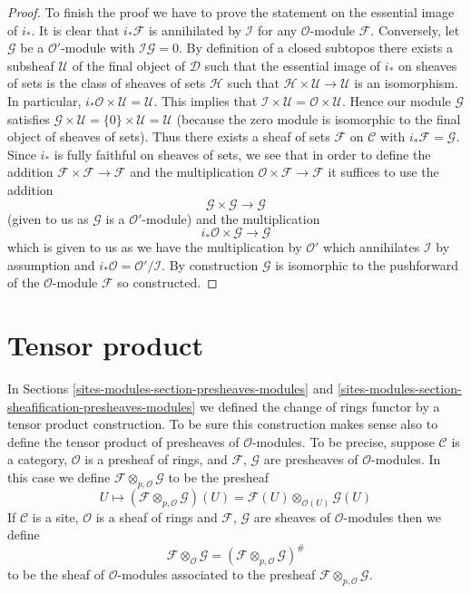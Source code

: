 \begin{proof}
\medskip\noindent
To finish the proof we have to prove the statement on the essential
image of $i_*$. It is clear that $i_*\mathcal{F}$ is annihilated by
$\mathcal{I}$ for any $\mathcal{O}$-module $\mathcal{F}$. Conversely,
let $\mathcal{G}$ be a $\mathcal{O}'$-module with
$\mathcal{I}\mathcal{G} = 0$. By definition of a closed subtopos
there exists a subsheaf $\mathcal{U}$ of the final object of
$\mathcal{D}$ such that the essential image of $i_*$ on sheaves of sets
is the class of sheaves of sets $\mathcal{H}$ such that
$\mathcal{H} \times \mathcal{U} \to \mathcal{U}$ is an isomorphism.
In particular, $i_*\mathcal{O} \times \mathcal{U} = \mathcal{U}$.
This implies that
$\mathcal{I} \times \mathcal{U} = \mathcal{O} \times \mathcal{U}$.
Hence our module $\mathcal{G}$ satisfies
$\mathcal{G} \times \mathcal{U} = \{0\} \times \mathcal{U} = \mathcal{U}$
(because the zero module is isomorphic to the final object of sheaves
of sets). Thus there exists a sheaf of sets $\mathcal{F}$ on $\mathcal{C}$
with $i_*\mathcal{F} = \mathcal{G}$. Since $i_*$ is fully faithful on sheaves
of sets, we see that in order to define the
addition $\mathcal{F} \times \mathcal{F} \to \mathcal{F}$ and the
multiplication $\mathcal{O} \times \mathcal{F} \to \mathcal{F}$
it suffices to use the addition
$$
\mathcal{G} \times \mathcal{G} \longrightarrow \mathcal{G}
$$
(given to us as $\mathcal{G}$ is a $\mathcal{O}'$-module)
and the multiplication
$$
i_*\mathcal{O} \times \mathcal{G} \to \mathcal{G}
$$
which is given to us as we have the multiplication by
$\mathcal{O}'$ which annihilates $\mathcal{I}$ by assumption
and $i_*\mathcal{O} = \mathcal{O}'/\mathcal{I}$. By construction
$\mathcal{G}$ is isomorphic to the pushforward of the $\mathcal{O}$-module
$\mathcal{F}$ so constructed.
\end{proof}

\section{Tensor product}
\label{sites-modules-section-tensor-product}
In Sections \ref{sites-modules-section-presheaves-modules} and
\ref{sites-modules-section-sheafification-presheaves-modules}
we defined the change of rings functor by a tensor
product construction. To be sure this construction makes sense also
to define the tensor product of presheaves of $\mathcal{O}$-modules.
To be precise, suppose $\mathcal{C}$ is a category,
$\mathcal{O}$ is a presheaf of rings, and $\mathcal{F}$, $\mathcal{G}$
are presheaves of $\mathcal{O}$-modules. In this case we define
$\mathcal{F} \otimes_{p, \mathcal{O}} \mathcal{G}$ to be the presheaf
$$
U
\longmapsto
(\mathcal{F} \otimes_{p, \mathcal{O}} \mathcal{G})(U)
=
\mathcal{F}(U) \otimes_{\mathcal{O}(U)} \mathcal{G}(U)
$$
If $\mathcal{C}$ is a site, $\mathcal{O}$ is a sheaf of rings and
$\mathcal{F}$, $\mathcal{G}$ are sheaves of $\mathcal{O}$-modules
then we define
$$
\mathcal{F} \otimes_\mathcal{O} \mathcal{G}
=
(\mathcal{F} \otimes_{p, \mathcal{O}} \mathcal{G})^\#
$$
to be the sheaf of $\mathcal{O}$-modules associated to the presheaf
$\mathcal{F} \otimes_{p, \mathcal{O}} \mathcal{G}$.

